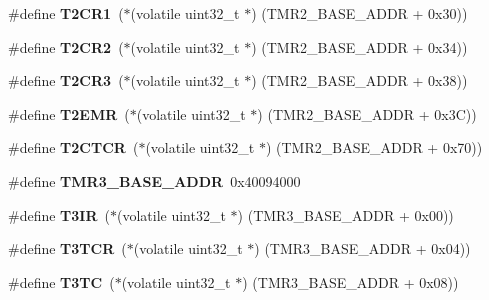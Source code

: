 \begin{DoxyCompactItemize}
\#define {\bfseries T2\+C\+R1}~($\ast$(volatile uint32\+\_\+t $\ast$) (T\+M\+R2\+\_\+\+B\+A\+S\+E\+\_\+\+A\+D\+DR + 0x30))
\item 
\mbox{\label{group__lpc24xx__regs_ga778d31dad9026f21c8784986d2780aa5}} 
\#define {\bfseries T2\+C\+R2}~($\ast$(volatile uint32\+\_\+t $\ast$) (T\+M\+R2\+\_\+\+B\+A\+S\+E\+\_\+\+A\+D\+DR + 0x34))
\item 
\mbox{\label{group__lpc24xx__regs_gaf8daeccac48fe581400d86d04a181f4f}} 
\#define {\bfseries T2\+C\+R3}~($\ast$(volatile uint32\+\_\+t $\ast$) (T\+M\+R2\+\_\+\+B\+A\+S\+E\+\_\+\+A\+D\+DR + 0x38))
\item 
\mbox{\label{group__lpc24xx__regs_ga9f155806d28261afb245e1ce07fcd580}} 
\#define {\bfseries T2\+E\+MR}~($\ast$(volatile uint32\+\_\+t $\ast$) (T\+M\+R2\+\_\+\+B\+A\+S\+E\+\_\+\+A\+D\+DR + 0x3\+C))
\item 
\mbox{\label{group__lpc24xx__regs_ga7d75e4234732204b090372849006e957}} 
\#define {\bfseries T2\+C\+T\+CR}~($\ast$(volatile uint32\+\_\+t $\ast$) (T\+M\+R2\+\_\+\+B\+A\+S\+E\+\_\+\+A\+D\+DR + 0x70))
\item 
\mbox{\label{group__lpc24xx__regs_ga0e9ee4d08133b83515d22c65b068476e}} 
\#define {\bfseries T\+M\+R3\+\_\+\+B\+A\+S\+E\+\_\+\+A\+D\+DR}~0x40094000
\item 
\mbox{\label{group__lpc24xx__regs_ga51402235821cfc688c6288de994d041e}} 
\#define {\bfseries T3\+IR}~($\ast$(volatile uint32\+\_\+t $\ast$) (T\+M\+R3\+\_\+\+B\+A\+S\+E\+\_\+\+A\+D\+DR + 0x00))
\item 
\mbox{\label{group__lpc24xx__regs_ga5b0db852baba1f4c6b0f0b7b0d8f1472}} 
\#define {\bfseries T3\+T\+CR}~($\ast$(volatile uint32\+\_\+t $\ast$) (T\+M\+R3\+\_\+\+B\+A\+S\+E\+\_\+\+A\+D\+DR + 0x04))
\item 
\mbox{\label{group__lpc24xx__regs_ga2503b3cb841e48de7d1b5aa3250d9734}} 
\#define {\bfseries T3\+TC}~($\ast$(volatile uint32\+\_\+t $\ast$) (T\+M\+R3\+\_\+\+B\+A\+S\+E\+\_\+\+A\+D\+DR + 0x08))
\item 

\end{DoxyCompactItemize}
